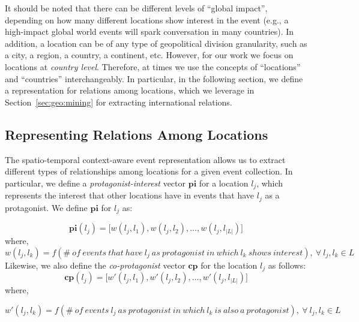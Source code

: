 It should be noted that there can be different levels of ``global impact'',
depending on how many different locations show interest in the event (e.g., a
high-impact global world events will spark conversation in many countries). 
%
In addition, a location can be of any type of geopolitical division granularity,
such as a city, a region, a country, a continent, etc. 
%
However, for our work we focus on locations at {\em country level}. 
%
Therefore, at times we use the concepts of ``locations'' and ``countries''
interchangeably.
%
In particular, in the following section, we define a representation for
relations among locations, which we leverage in Section~\ref{sec:geo:mining} for
extracting international relations.




\subsection{Representing Relations Among Locations}\label{sec:relations}

The spatio-temporal context-aware event representation allows us to extract
different types of relationships among locations for a given event collection.
%
In particular, we define a {\em protagonist-interest} vector $\mathbf{pi}$ for a
location $l_j$, which represents the interest that other locations have in
events that have $l_j$ as a protagonist.  
%
We define $\mathbf{pi}$ for $l_j$ as:

\begin{equation} \label{eq:pi}
\mathbf{pi}(l_j) = \Big[ w(l_j,l_1),w(l_j,l_2),\ldots,w(l_j,l_{|L|}) \Big]
\end{equation}
%
\noindent where,
%
\begin{equation} \label{eq:pi-w}
w(l_j,l_k)=
f(\mathit{\#~of~events~that~have}~l_j~\mathit{as~protagonist}~\mathit{in~which}~l_k~\mathit{shows~interest}),~\forall~l_j,l_k \in L
\end{equation}
%
Likewise, we also define the {\em co-protagonist} vector $\mathbf{cp}$ for the
location $l_j$ as follows:
%
\begin{equation} \label{eq:cp}
\mathbf{cp}(l_j) = \Big[ w'(l_j,l_1),w'(l_j,l_2),\ldots,w'(l_j,l_{|L|}) \Big]
\end{equation}
%
\noindent where,

\begin{equation} \label{eq:cp-w}
w'(l_j,l_k)=
f(\mathit{\#~of~events}~l_j~\mathit{as~protagonist}~\mathit{in~which}~l_k~\mathit{is~also~a~protagonist}),~\forall~l_j,l_k \in L
\end{equation}

